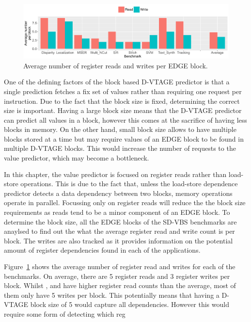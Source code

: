 \begin{figure}[t]
    \centering
    \includegraphics[width=1\textwidth]{chapter3/graphics/averageRegRead.pdf}

    \caption{Average number of register reads and writes per EDGE block.}
    \label{fig:edge_reg_read}
	\vspace{1em}
\end{figure}

One of the defining factors of the block based D-VTAGE predictor is that a single prediction fetches a fix set of values rather than requiring one request per instruction.
Due to the fact that the block size is fixed, determining the correct size is important.
Having a large block size means that the D-VTAGE predictor can predict all values in a block, however this comes at the sacrifice of having less blocks in memory.
On the other hand, small block size allows to have multiple blocks stored at a time but may require values of an EDGE block to be found in multiple D-VTAGE blocks.
This would increase the number of requests to the value predictor, which may become a bottleneck.

In this chapter, the value predictor is focused on register reads rather than load-store operations.
This is due to the fact that, unless the load-store dependence predictor detects a data dependency between two blocks, memory operations operate in parallel.
Focussing only on register reads will reduce the the block size requirements as reads tend to be a minor component of an EDGE block.
To determine the block size, all the EDGE blocks of the SD-VBS benchmarks are anaylsed to find out the what the average register read and write count is per block.
The writes are also tracked as it provides information on the potential amount of register dependencies found in each of the applications.

Figure~\ref{fig:edge_reg_read} shows the average number of register read and writes for each of the benchmarks.
On average, there are 5 register reads and 3 register writes per block.
Whilst  ,  and  have higher register read counts than the average, most of them only have 5 writes per block.
This potentially means that having a D-VTAGE block size of 5 would capture all dependencies.
However this would require some form of detecting which reg




